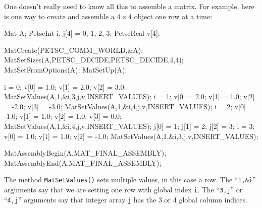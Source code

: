 One doesn't really need to know all this to assemble a matrix.  For example, here is one way to create and assemble a $4\times 4$ \pMat object one row at a time:
\begin{code}
Mat A;
PetscInt  i, j[4] = {0, 1, 2, 3};
PetscReal v[4];

MatCreate(PETSC_COMM_WORLD,&A);
MatSetSizes(A,PETSC_DECIDE,PETSC_DECIDE,4,4);
MatSetFromOptions(A);
MatSetUp(A);

i = 0;  v[0] = 1.0;  v[1] = 2.0;  v[2] = 3.0;
MatSetValues(A,1,&i,3,j,v,INSERT_VALUES);
i = 1;  v[0] = 2.0;  v[1] = 1.0;  v[2] = -2.0;  v[3] = -3.0;
MatSetValues(A,1,&i,4,j,v,INSERT_VALUES);
i = 2;  v[0] = -1.0;  v[1] = 1.0;  v[2] = 1.0;  v[3] = 0.0;
MatSetValues(A,1,&i,4,j,v,INSERT_VALUES);
j[0] = 1;  j[1] = 2;  j[2] = 3;
i = 3;  v[0] = 1.0;  v[1] = 1.0;  v[2] = -1.0;
MatSetValues(A,1,&i,3,j,v,INSERT_VALUES);

MatAssemblyBegin(A,MAT_FINAL_ASSEMBLY);
MatAssemblyEnd(A,MAT_FINAL_ASSEMBLY);
\end{code}
The method \texttt{MatSetValues()} sets multiple values, in this case a row.  The ``\texttt{1,\&i}'' arguments say that we are setting one row with global index \texttt{i}.  The ``\texttt{3,j}'' or ``\texttt{4,j}'' arguments say that integer array \texttt{j} has the 3 or 4 global column indices.

